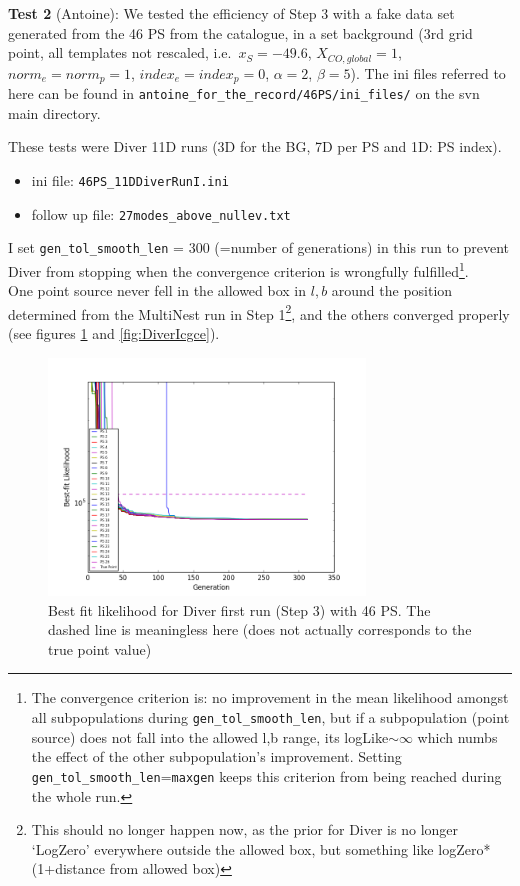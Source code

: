 \documentclass{article}
\begin{document}
\textbf{Test 2} (Antoine): We tested the efficiency of Step 3 with a fake data set generated from the 46 PS from the catalogue, in a set background (3rd grid point, all templates not rescaled, i.e.\ $x_S = -49.6$, $X_{CO, global} = 1$, $norm_e = norm_p = 1$, $index_e = index_p = 0$, $\alpha = 2$, $\beta = 5$). The ini files referred to here can be found in \verb=antoine_for_the_record/46PS/ini_files/= on the svn main directory.

These tests were Diver 11D runs (3D for the BG, 7D per PS and 1D: PS index). \begin{itemize}
\item ini file: \verb=46PS_11DDiverRunI.ini=
\item follow up file: \verb=27modes_above_nullev.txt=
\end{itemize}
I set \verb=gen_tol_smooth_len= = 300 (=number of generations) in this run to prevent Diver from stopping when the convergence criterion is wrongfully fulfilled\footnote{The convergence criterion is: no improvement in the mean likelihood amongst all subpopulations during \verb=gen_tol_smooth_len=, but if a subpopulation (point source) does not fall into the allowed l,b range, its logLike$\sim \infty$ which numbs the effect of the other subpopulation's improvement. Setting \verb=gen_tol_smooth_len==\verb=maxgen= keeps this criterion from being reached during the whole run.}. \\
One point source never fell in the allowed box in $l,b$ around the position determined from the MultiNest run in Step 1\footnote{This should no longer happen now, as the prior for Diver is no longer `LogZero' everywhere outside the allowed box, but something like logZero*(1+distance from allowed box)}, and the others converged properly (see figures \ref{fig:DiverIBFLike} and \ref{fig:DiverIcgce}).
\begin{figure}[h]
\centering
\includegraphics[clip = true,width=0.75\textwidth]{figs/DiverIBFLike.png}
\caption{Best fit likelihood for Diver first run (Step 3) with 46 PS. The dashed line is meaningless here (does not actually corresponds to the true point value)\label{fig:DiverIBFLike}}
\end{figure}
\end{document}
